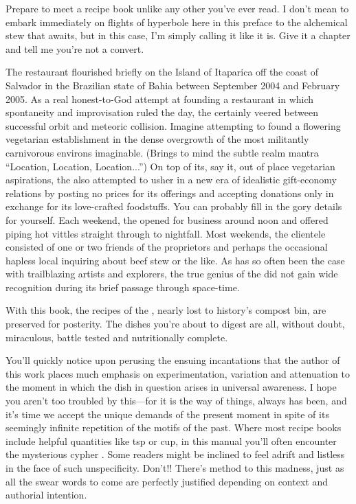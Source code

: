 
Prepare to meet a recipe book unlike any other you've ever read.  I
don't mean to embark immediately on flights of hyperbole here in this
preface to the alchemical stew that awaits, but in this case, I'm
simply calling it like it is.  Give it a chapter and tell me you're
not a convert.

The  restaurant flourished briefly on the Island of Itaparica
off the coast of Salvador in the Brazilian state of Bahia between
September 2004 and February 2005.  As a real honest-to-God attempt at
founding a restaurant in which spontaneity and improvisation ruled the
day, the  certainly veered between successful orbit and meteoric
collision.  Imagine attempting to found a flowering vegetarian
establishment in the dense overgrowth of the most militantly
carnivorous environs imaginable. (Brings to mind the subtle realm
mantra ``Location, Location, Location...'') On top of its, say it, out
of place vegetarian aspirations, the  also attempted to usher in
a new era of idealistic gift-economy relations by posting no prices
for its offerings and accepting donations only in exchange for its
love-crafted foodstuffs.  You can probably fill in the gory details
for yourself.  Each weekend, the  opened for business around
noon and offered piping hot vittles straight through to nightfall.
Most weekends, the clientele consisted of one or two friends of the
proprietors and perhaps the occasional hapless local inquiring about
beef stew or the like.  As has so often been the case with
trailblazing artists and explorers, the true genius of the  did
not gain wide recognition during its brief passage through space-time.

With this book, the recipes of the , nearly lost to history's
compost bin, are preserved for posterity.  The dishes you're about to
digest are all, without doubt, miraculous, battle tested and
nutritionally complete.

You'll quickly notice upon perusing the ensuing incantations that the
author of this work places much emphasis on experimentation, variation
and attenuation to the moment in which the dish in question arises in
universal awareness.  I hope you aren't too troubled by this---for it
is the way of things, always has been, and it's time we accept the
unique demands of the present moment in spite of its seemingly
infinite repetition of the motifs of the past.  Where most recipe
books include helpful quantities like \onequarter tsp or \onehalf cup, in
this manual you'll often encounter the mysterious cypher .  Some
readers might be inclined to feel adrift and listless in the face of
such unspecificity.  Don't!!  There's method to this madness, just as
all the swear words to come are perfectly justified depending on
context and authorial intention.

